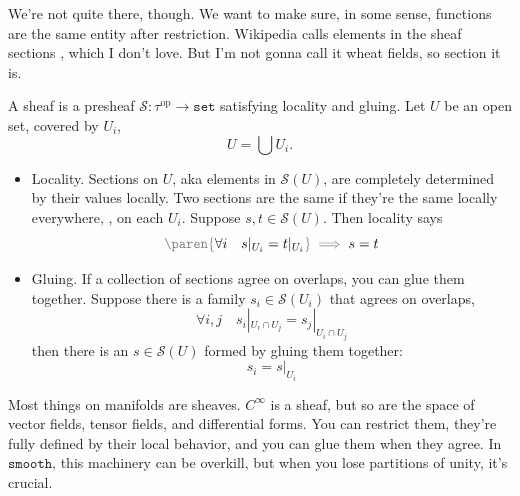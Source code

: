 \documentclass[a5paper]{scrartcl}
\def\setcat{\texttt{set}}
\def\smooth{\texttt{smooth}}
\newcommand{\gray}[1]{{\color{gray}#1}}
\newcommand{\black}[1]{{\color{black}#1}}
\newcommand{\gparen}[1]{\left .\!{\gray{\paren{\black{#1}}}}\!\right.}
\newcommand{\op}{\textrm{op}}
\let\oldimplies\implies
\def\implies{\color{gray}\oldimplies\color{black}}
\begin{document}
We're not quite there, though. We want to make sure, in some sense, functions are the same entity after restriction. Wikipedia calls elements in the sheaf sections \cite{wiki-sheaf}, which I don't love. But I'm not gonna call it wheat fields, so section it is.
\begin{defn}[Sheaf]
  \def\S{\mathcal S}
  A sheaf is a presheaf \(\S:\tau^{\op}\to \setcat\) satisfying locality and gluing. Let \(U\) be an open set, covered by \(U_i\),
  \[
    U= \bigcup U_i.
  \]
  \begin{itemize}
    \item Locality. Sections on \(U\), aka elements in \(\S(U)\), are completely determined by their values locally. Two sections are the same if they're the same locally everywhere, \ie, on each \(U_i\). Suppose \(s,t\in \S(U)\). Then locality says
          \[
          \gparen{\forall i \quad s|_{U_i} = t|_{U_i} } \implies s = t
          \]

    \item Gluing. If a collection of sections agree on overlaps, you can glue them together. Suppose there is a family \(s_i\in \S(U_i)\) that agrees on overlaps,
          \[
          \forall i,j \quad { s_i|_{U_i \cap U_j} = s_j|_{U_i\cap U_j} }
          \]
          then there is an \(s\in \S(U)\) formed by gluing them together:
          \[
          s_i = s|_{U_i}
          \]
  \end{itemize}
  \cite{wiki-sheaf}
\end{defn}
Most things on manifolds are sheaves. \(C^\infty\) is a sheaf, but so are the space of vector fields, tensor fields, and differential forms. You can restrict them, they're fully defined by their local behavior, and you can glue them when they agree. In \(\smooth\), this machinery can be overkill, but when you lose partitions of unity, it's crucial.
\end{document}
